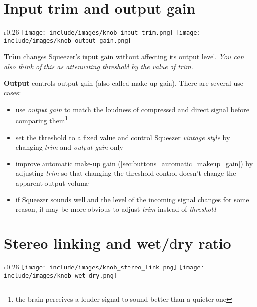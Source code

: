 \section{Input trim and output gain}
\label{sec:input_trim_and_output_gain}

\begin{wrapfigure}{r}{0.26\linewidth}
  \texttt{[image: include/images/knob\_input\_trim.png]}
  \texttt{[image: include/images/knob\_output\_gain.png]}
\end{wrapfigure}

\textbf{Trim} changes Squeezer's input gain without affecting its
output level.  \emph{You can also think of this as attenuating
  threshold by the value of trim.}

\textbf{Output} controls output gain (also called make-up gain).
There are several use cases:

\begin{itemize}
\item use \emph{output gain} to match the loudness of compressed and
  direct signal before comparing them\footnote{the brain perceives a
    louder signal to sound better than a quieter one}

\item set the threshold to a fixed value and control Squeezer
  \emph{vintage style} by changing \emph{trim} and \emph{output gain}
  only

\item improve automatic make-up gain
  (\ref{sec:buttons_automatic_makeup_gain}) by adjusting \emph{trim}
  so that changing the threshold control doesn't change the apparent
  output volume

\item if Squeezer sounds well and the level of the incoming signal
  changes for some reason, it may be more obvious to adjust
  \emph{trim} instead of \emph{threshold}
\end{itemize}

\section{Stereo linking and wet/dry ratio}

\begin{wrapfigure}{r}{0.26\linewidth}
  \texttt{[image: include/images/knob\_stereo\_link.png]}
  \texttt{[image: include/images/knob\_wet\_dry.png]}
\end{wrapfigure}

